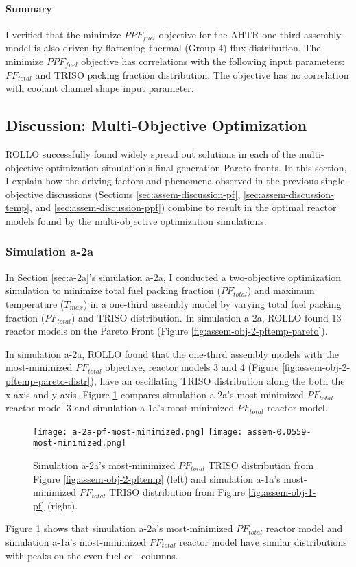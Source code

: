 \paragraph{Summary}
I verified that the minimize $PPF_{fuel}$ objective for the \gls{AHTR} one-third assembly 
model is also driven by flattening thermal (Group 4) flux distribution. 
The minimize $PPF_{fuel}$ objective has correlations with the following input parameters: 
$PF_{total}$ and TRISO packing fraction distribution. 
The objective has no correlation with coolant channel shape input parameter.

\subsection{Discussion: Multi-Objective Optimization}
\label{sec:assem-discussion-multi}
\gls{ROLLO} successfully found widely spread out solutions in each of the multi-objective 
optimization simulation's final generation Pareto fronts.
In this section, I explain how the driving factors and phenomena observed in 
the previous single-objective discussions (Sections 
\ref{sec:assem-discussion-pf}, \ref{sec:assem-discussion-temp}, and 
\ref{sec:assem-discussion-ppf}) combine to result in the optimal reactor models found 
by the multi-objective optimization simulations. 

\subsubsection{Simulation a-2a}
In Section \ref{sec:a-2a}'s simulation a-2a, I conducted a two-objective 
optimization simulation to minimize total fuel packing fraction ($PF_{total}$) and 
maximum temperature ($T_{max}$) in a one-third assembly model by varying total fuel 
packing fraction ($PF_{total}$) and TRISO distribution. 
In simulation a-2a, ROLLO found 13 reactor models on the Pareto Front (Figure 
\ref{fig:assem-obj-2-pftemp-pareto}). 

In simulation a-2a, \gls{ROLLO} found that the one-third assembly models with the 
most-minimized $PF_{total}$ objective, reactor models 3 and 4 (Figure 
\ref{fig:assem-obj-2-pftemp-pareto-distr}), have an oscillating TRISO distribution 
along the both the x-axis and y-axis. 
Figure \ref{fig:a-2a-pf-triso-comparison} compares simulation a-2a's most-minimized 
$PF_{total}$ reactor model 3 and simulation a-1a's most-minimized $PF_{total}$ reactor 
model. 
\begin{figure}[htbp!]
    \centering
    \texttt{[image: a-2a-pf-most-minimized.png]} 
    \texttt{[image: assem-0.0559-most-minimized.png]} 
    \caption{Simulation a-2a's most-minimized $PF_{total}$ TRISO distribution 
    from Figure \ref{fig:assem-obj-2-pftemp} (left) and simulation a-1a's 
    most-minimized $PF_{total}$ TRISO distribution from Figure 
    \ref{fig:assem-obj-1-pf} (right).}
    \label{fig:a-2a-pf-triso-comparison}
\end{figure}
Figure \ref{fig:a-2a-pf-triso-comparison} shows that simulation a-2a's most-minimized 
$PF_{total}$ reactor model and simulation a-1a's most-minimized $PF_{total}$ reactor 
model have similar distributions with peaks on the even fuel cell columns. 

